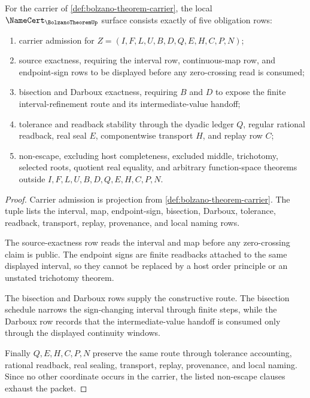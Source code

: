 \begin{theorem}
\label{thm:bolzano-theorem-namecert-obligations}
For the carrier of \autoref{def:bolzano-theorem-carrier}, the local $\NameCert_{\BolzanoTheoremUp}$ surface consists exactly of five obligation rows:
\begin{enumerate}
\item carrier admission for $Z=(I,F,L,U,B,D,Q,E,H,C,P,N)$;
\item source exactness, requiring the interval row, continuous-map row, and endpoint-sign rows to be displayed before any zero-crossing read is consumed;
\item bisection and Darboux exactness, requiring $B$ and $D$ to expose the finite interval-refinement route and its intermediate-value handoff;
\item tolerance and readback stability through the dyadic ledger $Q$, regular rational readback, real seal $E$, componentwise transport $H$, and replay row $C$;
\item non-escape, excluding host completeness, excluded middle, trichotomy, selected roots, quotient real equality, and arbitrary function-space theorems outside $I,F,L,U,B,D,Q,E,H,C,P,N$.
\end{enumerate}
\end{theorem}
\begin{proof}
Carrier admission is projection from \autoref{def:bolzano-theorem-carrier}. The tuple lists the interval, map, endpoint-sign, bisection, Darboux, tolerance, readback, transport, replay, provenance, and local naming rows.

The source-exactness row reads the interval and map before any zero-crossing claim is public. The endpoint signs are finite readbacks attached to the same displayed interval, so they cannot be replaced by a host order principle or an unstated trichotomy theorem.

The bisection and Darboux rows supply the constructive route. The bisection schedule narrows the sign-changing interval through finite steps, while the Darboux row records that the intermediate-value handoff is consumed only through the displayed continuity windows.

Finally $Q,E,H,C,P,N$ preserve the same route through tolerance accounting, rational readback, real sealing, transport, replay, provenance, and local naming. Since no other coordinate occurs in the carrier, the listed non-escape clauses exhaust the packet.
\end{proof}

